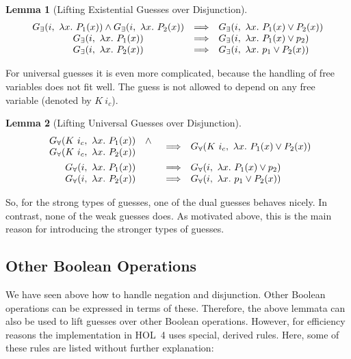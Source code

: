 \documentclass[a4paper,12pt,DIV=12,oneside]{scrbook}
\newtheorem{lemma}{Lemma}[section]
\theoremstyle{definition}
\theoremstyle{remark}
\newcommand{\GE}{\ensuremath{G_\exists}}
\newcommand{\GU}{\ensuremath{G_\forall}}
\begin{document}
\begin{lemma}[Lifting Existential Guesses over Disjunction]\label{lemma_guesses_lift_disj_E}
\[
\begin{array}{c@{\quad}c@{\quad}l}
\GE(i,\ \lambda x.\ P_1(x)) \wedge \GE(i,\ \lambda x.\ P_2(x)) & \Longrightarrow & \GE(i,\ \lambda x.\ P_1(x) \vee P_2(x)) \\
\GE(i,\ \lambda x.\ P_1(x)) & \Longrightarrow & \GE(i,\ \lambda x.\ P_1(x) \vee p_2) \\
\GE(i,\ \lambda x.\ P_2(x)) & \Longrightarrow & \GE(i,\ \lambda x.\ p_1 \vee P_2(x))
\end{array}
\]
\end{lemma}

For universal guesses it is even more complicated, because the handling of free variables does not fit well.
The guess is not allowed to depend on any free variable (denoted by $K\ i_c$). 
\begin{lemma}[Lifting Universal Guesses over Disjunction]\label{lemma_guesses_lift_disj_A}
\[
\begin{array}{c@{\quad}c@{\quad}l}
\begin{array}{cl}
\GU(K\ i_c,\ \lambda x.\ P_1(x)) & \wedge \\
\GU(K\ i_c,\ \lambda x.\ P_2(x)) 
\end{array} & \Longrightarrow & \GU(K\ i_c,\ \lambda x.\ P_1(x) \vee P_2(x)) \\[1em]
\GU(i,\ \lambda x.\ P_1(x)) & \Longrightarrow & \GU(i,\ \lambda x.\ P_1(x) \vee p_2) \\
\GU(i,\ \lambda x.\ P_2(x)) & \Longrightarrow & \GU(i,\ \lambda x.\ p_1 \vee P_2(x))
\end{array}
\]
\end{lemma}

So, for the strong types of guesses, one of the dual guesses behaves
nicely.  In contrast, none of the weak guesses does. As motivated
above, this is the main reason for introducing the stronger types of
guesses.


\subsection{Other Boolean Operations}

We have seen above how to handle negation and disjunction. Other Boolean operations can be expressed in terms of these.
Therefore, the above lemmata can also be used to lift guesses over other Boolean operations. However, for efficiency
reasons the implementation in HOL~4 uses special, derived rules. Here, some of these rules are listed without further explanation:
\end{document}
